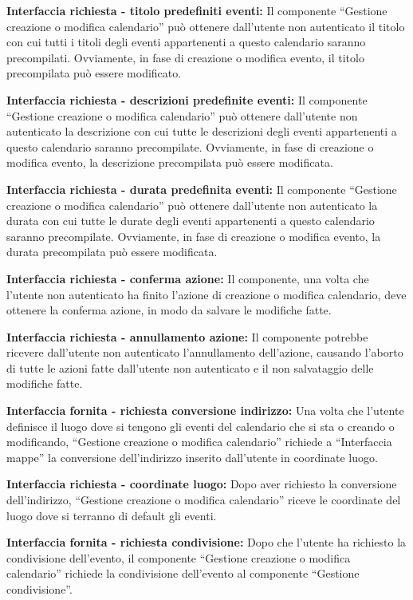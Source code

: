 \begin{listaPersonale}[]{}
    \textbf{Interfaccia richiesta - titolo predefiniti eventi:} Il componente “Gestione creazione o modifica calendario” può ottenere dall'utente non autenticato il titolo con cui tutti i titoli degli eventi appartenenti a questo calendario saranno precompilati. Ovviamente, in fase di creazione o modifica evento, il titolo precompilata può essere modificato.

    \textbf{Interfaccia richiesta - descrizioni predefinite eventi:} Il componente “Gestione creazione o modifica calendario” può ottenere dall'utente non autenticato la descrizione con cui tutte le descrizioni degli eventi appartenenti a questo calendario saranno precompilate. Ovviamente, in fase di creazione o modifica evento, la descrizione precompilata può essere modificata.

    \textbf{Interfaccia richiesta - durata predefinita eventi:} Il componente “Gestione creazione o modifica calendario” può ottenere dall'utente non autenticato la durata con cui tutte le durate degli eventi appartenenti a questo calendario saranno precompilate. Ovviamente, in fase di creazione o modifica evento, la durata precompilata può essere modificata.

    \textbf{Interfaccia richiesta - conferma azione:} Il componente, una volta che l'utente non autenticato ha finito l'azione di creazione o modifica calendario,  deve ottenere la conferma azione, in modo da salvare le modifiche fatte.

    \textbf{Interfaccia richiesta - annullamento azione:} Il componente potrebbe ricevere dall'utente non autenticato l'annullamento dell'azione, causando l'aborto di tutte le azioni fatte dall'utente non autenticato e il non salvataggio delle modifiche fatte.

    \textbf{Interfaccia fornita - richiesta conversione indirizzo:} Una volta che l'utente definisce il luogo dove si tengono gli eventi del calendario che si sta o creando o modificando, “Gestione creazione o modifica calendario” richiede a “Interfaccia mappe” la conversione dell'indirizzo inserito dall'utente in coordinate luogo.

    \textbf{Interfaccia richiesta - coordinate luogo:} Dopo aver richiesto la conversione dell'indirizzo, “Gestione creazione o modifica calendario” riceve le coordinate del luogo dove si terranno di default gli eventi.

    \textbf{Interfaccia fornita - richiesta condivisione:} Dopo che l'utente ha richiesto la condivisione dell'evento, il componente “Gestione creazione o modifica calendario” richiede la condivisione dell'evento al componente “Gestione condivisione”.


\end{listaPersonale}
